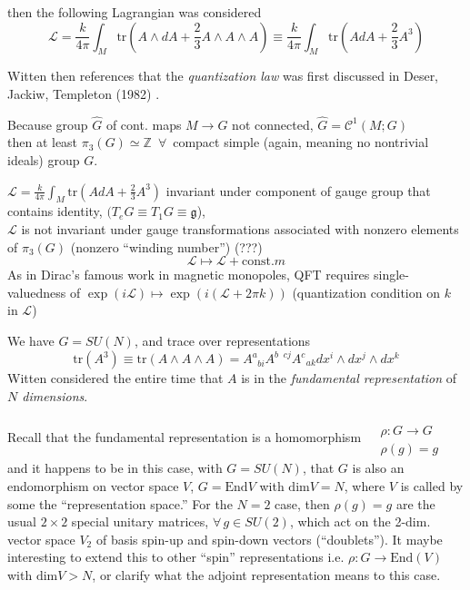 \documentclass[10pt]{amsart}
\begin{document}
then the following Lagrangian was considered
\[
\mathcal{L} = \frac{k}{4\pi} \int_M \text{tr}(A \wedge dA + \frac{2}{3} A \wedge A \wedge A ) \equiv \frac{k}{4\pi } \int_M \text{tr}(AdA + \frac{2}{3}A^3)
\]

Witten then references that the \emph{quantization law} was first discussed in Deser, Jackiw, Templeton (1982) \cite{DJT1982}.

Because group $\widehat{G}$ of cont. maps $M \to G$ not connected, $\widehat{G} = \mathcal{C}^1(M;G)$  \\
\phantom{\qquad} then at least $\pi_3(G) \simeq \mathbb{Z}$\, $\forall \, $ compact simple (again, meaning no nontrivial ideals) group $G$.  

$\mathcal{L} = \frac{k}{4\pi } \int_M \text{tr}(AdA + \frac{2}{3} A^3)$ invariant under component of gauge group that contains identity, $(T_eG \equiv T_1G \equiv \mathfrak{g}$), \\

$\mathcal{L}$ is not invariant under gauge transformations associated with nonzero elements of $\pi_3(G)$ (nonzero ``winding number'') (???)
\[
\mathcal{L} \mapsto \mathcal{L} + \text{const.}m
\]
As in Dirac's famous work in magnetic monopoles, QFT requires  single-valuedness of $\exp{(i\mathcal{L})} \mapsto \exp{(i(\mathcal{L} + 2\pi k )) }$ (quantization condition on $k$ in $\mathcal{L}$)

We have $G=SU(N)$, and trace over representations
\[
\text{tr}(A^3) \equiv \text{tr}(A\wedge A \wedge A) = A^a_{\; \; bi } A^{b \; \; cj} A^c_{ \; \; ak} dx^i \wedge dx^j \wedge dx^k
\]
Witten considered the entire time that $A$ is in the \emph{fundamental representation} of \emph{$N$ dimensions}.

Recall that the fundamental representation is a homomorphism $\begin{aligned} & \quad \\
  & \rho : G \to G \\ & \rho(g)=g \end{aligned}$
and it happens to be in this case, with $G=SU(N)$, that $G$ is also an endomorphism on vector space $V$, $G=\text{End}V$ with $\text{dim}V=N$, where $V$ is called by some the ``representation space.''  For the $N=2$ case, then $\rho(g)=g$ are the usual $2\times 2$ special unitary matrices, $\forall \, g \in SU(2)$, which act on the 2-dim. vector space $V_2$ of basis spin-up and spin-down vectors (``doublets'').  It maybe interesting to extend this to other ``spin'' representations i.e. $\rho:G \to \text{End}(V)$ with $\text{dim}V > N$, or clarify what the adjoint representation means to this case.
\end{document}
